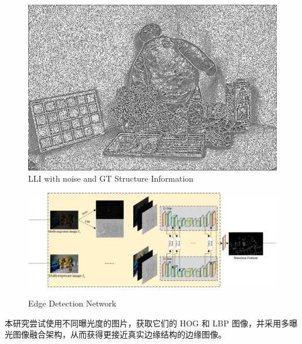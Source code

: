 \documentclass[CJK,aspectratio=169]{beamer}  %
\begin{document}
\begin{frame}
\begin{figure}
\begin{minipage}{.3\textwidth}
				\caption*{\small GT HOG}
			\end{minipage}
			\begin{minipage}{.3\textwidth}
				\centering
				\includegraphics[width=\linewidth]{picture/LLIE/My Architecture/Edge Detection/normal00269_lbp}
				\caption*{\small GT LBP}
			\end{minipage}
			\caption{
				\label{fig: LLI Structure Information1}
				\small LLI with noise and GT Structure Information
			}
		\end{figure}
	\end{frame}
	
	\begin{frame}
		\begin{figure}
			\centering
			\setlength{\abovecaptionskip}{-0.05cm} 	
			\begin{minipage}{0.9\textwidth}
				\centering
				\includegraphics[width=\linewidth]{picture/LLIE/My Architecture/Edge Detection Network}
				\captionsetup{font=scriptsize}
				\label{fig: Edge Detection Network}	
				\caption{Edge Detection Network}
			\end{minipage}
		\end{figure}
		
		\vspace{-0.5cm}
		
		{ \yahei 本研究尝试使用不同曝光度的图片，获取它们的 HOG 和 LBP 图像，并采用多曝光图像融合架构，从而获得更接近真实边缘结构的边缘图像。}
	\end{frame}
	
\end{document}

